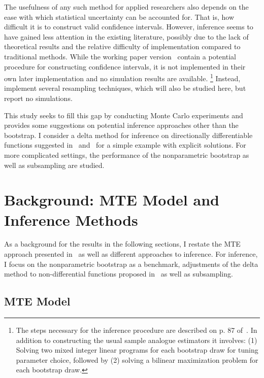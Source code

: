 \documentclass[12pt,a4paper,english]{article} %
\numberwithin{equation}{section}
\theoremstyle{definition}
\theoremstyle{remark}
\theoremstyle{plain}
\begin{document}
The usefulness of any such method for applied researchers also depends on the ease with which statistical uncertainty can be accounted for.
That is, how difficult it is to construct valid confidence intervals.
However, inference seems to have gained less attention in the existing literature, possibly due to the lack of theoretical results and the relative difficulty of implementation compared to traditional methods.
While the working paper version~\cite{mogstad2017using_nber} contain a potential procedure for constructing confidence intervals, it is not implemented in their own later implementation \citep{shea2023ivmte} and no simulation results are available.
\footnote{The steps necessary for the inference procedure are described on p. 87 of~\cite{mogstad2017using_nber}.
In addition to constructing the usual sample analogue estimators it involves: (1) Solving two mixed integer linear programs for each bootstrap draw for tuning parameter choice, followed by (2) solving a bilinear maximization problem for each bootstrap draw.}
Instead,~\cite{shea2023ivmte} implement several resampling techniques, which will also be studied here, but report no simulations.

This study seeks to fill this gap by conducting Monte Carlo experiments and provides some suggestions on potential inference approaches other than the bootstrap.
I consider a delta method for inference on directionally differentiable functions suggested in~\cite{fang2019infdirdiff} and~\cite{hong2018numerical} for a simple example with explicit solutions.
For more complicated settings, the performance of the nonparametric bootstrap as well as subsampling are studied.

\section{Background: MTE Model and Inference Methods}\label{sec:general_mte}
As a background for the results in the following sections, I restate the MTE approach presented in~\cite{mogstad2018using} as well as different approaches to inference.
For inference, I focus on the nonparametric bootstrap as a benchmark, adjustments of the delta method to non-differential functions proposed in~\cite{fang2019infdirdiff} as well as subsampling.

\subsection{MTE Model}
\end{document}

